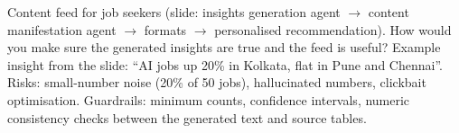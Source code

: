 \begin{qa}{\deep Content feed for job seekers (slide: insights generation agent $\to$ content manifestation agent $\to$ formats $\to$ personalised recommendation). How would you make sure the
generated insights are true and the feed is useful?}
\why Example insight from the slide: ``AI jobs up 20\% in Kolkata, flat in Pune and Chennai''. Risks: small-number noise (20\% of 50 jobs), hallucinated numbers, clickbait optimisation.
Guardrails: minimum counts, confidence intervals, numeric consistency checks between the generated text and source tables.
\end{qa}
